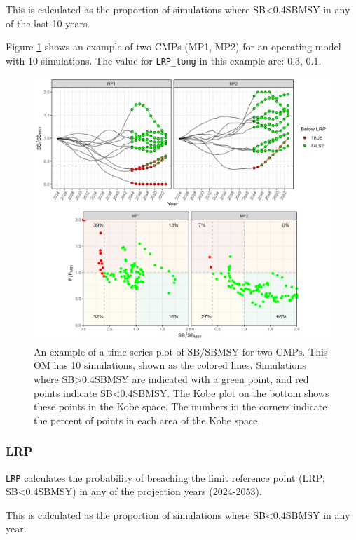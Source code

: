 \documentclass[
]{article}
\begin{document}
This is calculated as the proportion of simulations where SB\textless0.4SBMSY in any of the last 10 years.

Figure \ref{fig:LRP-long} shows an example of two CMPs (MP1, MP2) for an operating model with 10 simulations. The value for \texttt{LRP\_long} in this example are: 0.3, 0.1.

\begin{figure}
\includegraphics[width=37.5in]{../../img/PMs/LRP_long} \caption{An example of a time-series plot of SB/SBMSY for two CMPs. This OM has 10 simulations, shown as the colored lines. Simulations where SB>0.4SBMSY are indicated with a green point, and red points indicate SB<0.4SBMSY. The Kobe plot on the bottom shows these points in the Kobe space. The numbers in the corners indicate the percent of points in each area of the Kobe space.}\label{fig:LRP-long}
\end{figure}

\hypertarget{lrp}{%
\subsubsection{LRP}\label{lrp}}

\texttt{LRP} calculates the probability of breaching the limit reference point (LRP; SB\textless0.4SBMSY) in any of the projection years (2024-2053).

This is calculated as the proportion of simulations where SB\textless0.4SBMSY in any year.
\end{document}
